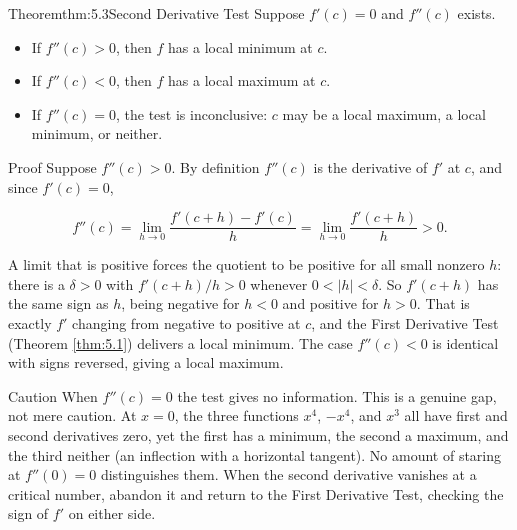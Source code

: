 \documentclass[a4paper,12pt,oneside]{memoir}
\begin{document}
\begin{envtheorem}{Theorem}{thm:5.3}{Second Derivative Test}
Suppose \(f'(c) = 0\) and \(f''(c)\) exists.

\begin{itemize}
  \item If \(f''(c) > 0\), then \(f\) has a local minimum at \(c\).
  \item If \(f''(c) < 0\), then \(f\) has a local maximum at \(c\).
  \item If \(f''(c) = 0\), the test is inconclusive: \(c\) may be a local maximum, a local minimum, or neither.
\end{itemize}
\end{envtheorem}
\begin{envproof}{Proof}{}{}
Suppose \(f''(c) > 0\). By definition \(f''(c)\) is the derivative of \(f'\) at \(c\), and since \(f'(c) = 0\),

\[ f''(c) = \lim_{h \to 0} \frac{f'(c + h) - f'(c)}{h} = \lim_{h \to 0} \frac{f'(c + h)}{h} > 0. \]

A limit that is positive forces the quotient to be positive for all small nonzero \(h\): there is a \(\delta > 0\) with \(f'(c + h)/h > 0\) whenever \(0 < |h| < \delta\). So \(f'(c + h)\) has the same sign as \(h\), being negative for \(h < 0\) and positive for \(h > 0\). That is exactly \(f'\) changing from negative to positive at \(c\), and the First Derivative Test (Theorem \ref{thm:5.1}) delivers a local minimum. The case \(f''(c) < 0\) is identical with signs reversed, giving a local maximum. \qedmark
\end{envproof}
\begin{envcaution}{Caution}{}{}
When \(f''(c) = 0\) the test gives no information. This is a genuine gap, not mere caution. At \(x = 0\), the three functions \(x^{4}\), \(-x^{4}\), and \(x^{3}\) all have first and second derivatives zero, yet the first has a minimum, the second a maximum, and the third neither (an inflection with a horizontal tangent). No amount of staring at \(f''(0) = 0\) distinguishes them. When the second derivative vanishes at a critical number, abandon it and return to the First Derivative Test, checking the sign of \(f'\) on either side.
\end{envcaution}
\end{document}
